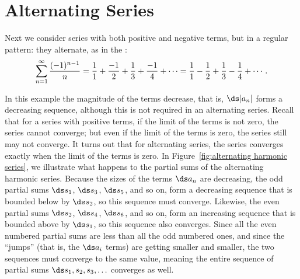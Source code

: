 \section{Alternating Series}\label{sec:AlternatingSeries}

Next we consider series with both positive and negative terms, but in
a regular pattern: they alternate, as in the :
$$
  \sum_{n=1}^\infty {(-1)^{n-1}\over n}=
  {1\over1}+{-1\over2}+{1\over3}+{-1\over4}+\cdots=
  {1\over1}-{1\over2}+{1\over3}-{1\over4}+\cdots.
$$

In this example the magnitude of the terms decrease, that is, 
$\ds |a_n|$ forms a decreasing sequence, although this is not required in an
alternating series. Recall that for a series with positive terms, if the limit
of the terms is not zero, the series cannot converge; but even if the limit
of the terms is zero, the series still may not converge. It turns out that for
alternating series, the series converges exactly when the limit of the terms is zero.
In Figure~\ref{fig:alternating harmonic series}, we illustrate what happens to
the partial sums of the alternating harmonic series. Because the sizes of
the terms $\ds a_n$ are decreasing, the odd partial sums $\ds s_1$, $\ds s_3$, $\ds s_5$,
and so on, form a decreasing sequence that is bounded below by
$\ds s_2$, so this sequence must converge.
Likewise, the even partial sums $\ds s_2$, $\ds s_4$, $\ds s_6$,
and so on, form an increasing sequence that is bounded above by
$\ds s_1$, so this sequence also converges. Since all the even numbered
partial sums are less than all the odd numbered ones, and since the
``jumps'' (that is, the $\ds a_i$ terms) are getting smaller and smaller,
the two sequences must converge to the same value, meaning the entire
sequence of partial sums $\ds s_1,s_2,s_3,\ldots$ converges as well.


